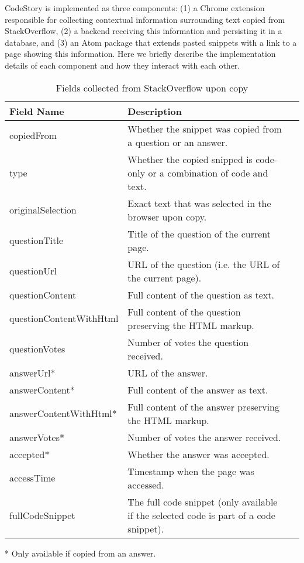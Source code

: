 \documentclass[../manifest.tex]{subfiles}
\begin{document}
CodeStory is implemented as three components: (1) a Chrome extension responsible for collecting contextual information surrounding text copied from StackOverflow, (2) a backend receiving this information and persisting it in a database, and (3) an Atom package that
extends pasted snippets with a link to a page showing this information. Here we briefly describe the implementation details of each component and how they interact with each other.

\begin{table*}[t]
    \caption{Fields collected from StackOverflow upon copy}
    \label{tab:chrome-extension-fields}
    \centering
    \begin{threeparttable}
    \begin{tabular*}{\textwidth}{lll}
    \hline
    \textbf{Field Name} & \textbf{Description} \\
    \hline
    copiedFrom 					& Whether the snippet was copied from a question or an answer.\\
    type 						& Whether the copied snipped is code-only or a combination of code and text.\\
    originalSelection 			& Exact text that was selected in the browser upon copy.\\
    questionTitle 				& Title of the question of the current page.\\
    questionUrl      			& URL of the question (i.e. the URL of the current page).\\
    questionContent     		& Full content of the question as text.\\
    questionContentWithHtml     & Full content of the question preserving the HTML markup.\\
    questionVotes				& Number of votes the question received.\\
    answerUrl* 					& URL of the answer.\\
    answerContent*    			& Full content of the answer as text.\\
    answerContentWithHtml*		& Full content of the answer preserving the HTML markup.\\
    answerVotes*    			& Number of votes the answer received.\\
    accepted*					& Whether the answer was accepted.\\
    accessTime    				& Timestamp when the page was accessed.\\
    fullCodeSnippet    			& The full code snippet (only available if the selected code is part of a code snippet).\\
    \hline
    \end{tabular*}
    \begin{tablenotes}\footnotesize
        \item [*] Only available if copied from an answer.
    \end{tablenotes}
    \end{threeparttable}
\end{table*}
\end{document}
